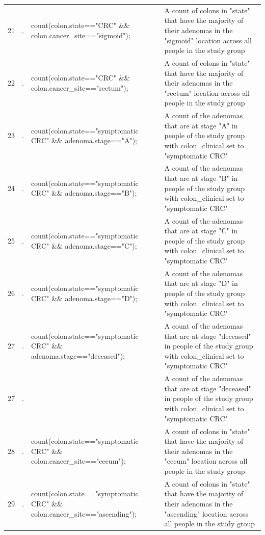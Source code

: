 \documentclass[11pt]{article}
\begin{document}
\begin{landscape}
\begin{longtable}{||l|l|p{11.3cm}|p{11.3cm}||}
21           & .       & count(colon.state=="CRC" \&\& colon.cancer\_site=="sigmoid");                  &   A count of colons in "state" that have the majority of their adenomas in the "sigmoid" location across all people in the study group \\
22           & .       & count(colon.state=="CRC" \&\& colon.cancer\_site=="rectum");                   &   A count of colons in "state" that have the majority of their adenomas in the "rectum" location across all people in the study group \\
23           & .       & count(colon.state=="symptomatic CRC" \&\& adenoma.stage=="A");                &   A count of the adenomas that are at stage "A" in people of the study group with colon\_clinical set to "symptomatic CRC" \\
24           & .       & count(colon.state=="symptomatic CRC" \&\& adenoma.stage=="B");                &   A count of the adenomas that are at stage "B" in people of the study group with colon\_clinical set to "symptomatic CRC" \\
25           & .       & count(colon.state=="symptomatic CRC" \&\& adenoma.stage=="C");                &   A count of the adenomas that are at stage "C" in people of the study group with colon\_clinical set to "symptomatic CRC" \\
26           & .       & count(colon.state=="symptomatic CRC" \&\& adenoma.stage=="D");                &   A count of the adenomas that are at stage "D" in people of the study group with colon\_clinical set to "symptomatic CRC" \\
27           & .       &  count(colon.state=="symptomatic CRC" \&\& adenoma.stage=="deceased");         &   A count of the adenomas that are at stage "deceased" in people of the study group with colon\_clinical set to "symptomatic CRC" \\
27           & .       & \centering{ count(colon.state=="symptomatic CRC" \&\& adenoma.stage=="deceased");    }     &   A count of the adenomas that are at stage "deceased" in people of the study group with colon\_clinical set to "symptomatic CRC" \\
28           & .       & count(colon.state=="symptomatic CRC" \&\& colon.cancer\_site=="cecum");        &   A count of colons in "state" that have the majority of their adenomas in the "cecum" location across all people in the study group \\
29           & .       & count(colon.state=="symptomatic CRC" \&\& colon.cancer\_site=="ascending");    &   A count of colons in "state" that have the majority of their adenomas in the "ascending" location across all people in the study group \\

\end{longtable}
\end{landscape}
\end{document}

